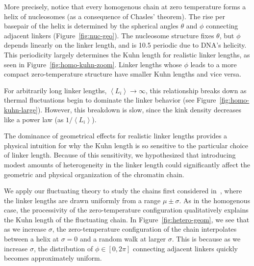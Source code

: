 \documentclass[%
 reprint,
superscriptaddress,
showpacs,preprintnumbers,
 amsmath,amssymb,
 aps,
 prl,
]{revtex4-1}
\newcommand{\meanli}{\left\langle{}L_i\right\rangle}
\begin{document}
More precisely, notice that every homogenous chain at zero temperature forms a
    helix of nucleosomes (as a consequence of Chasles' theorem).
The rise per basepair of the helix is determined by the spherical angles
    $\theta$ and $\phi$ connecting adjacent linkers (Figure~\ref{fig:nuc-geo}).
The nucleosome structure fixes $\theta$, but $\phi$ depends linearly on the
    linker length, and is \SI{10.5}{\basepair} periodic due to DNA's helicity.
This periodicity largely determines the Kuhn length for realistic linker
    lengths, as seen in Figure~\ref{fig:homo-kuhn-zoom}.
Linker lengths whose $\phi$ leads to a more compact zero-temperature structure
    have smaller Kuhn lengths and vice versa.

For arbitrarily long linker lengths, $\meanli\to\infty$, this relationship breaks
    down as thermal fluctuations begin to dominate the linker behavior (see
    Figure~\ref{fig:homo-kuhn-large}).
However, this breakdown is slow, since the kink density decreases like a power law
    (as $1/\meanli$).

The dominance of geometrical effects for realistic linker lengths provides a
    physical intuition for why the Kuhn length is so sensitive to the particular
    choice of linker length.
Because of this sensitivity, we hypothesized that introducing modest amounts of
    heterogeneity in the linker length could significantly affect the geometric
    and physical organization of the chromatin chain.

We apply our fluctuating theory to study the chains first considered
    in~\cite{woodcock1993}, where the linker lengths are drawn uniformly from a
    range $\mu \pm \sigma$.
As in the homogenous case, the processivity of the zero-temperature
    configuration qualitatively explains the Kuhn length of the fluctuating chain.
In Figure~\ref{fig:hetero-geom}, we see that as we increase $\sigma$, the
    zero-temperature configuration of the chain interpolates between a helix at
    $\sigma = 0$ and a random walk at larger $\sigma$.
This is because as we increase $\sigma$, the distribution of $\phi \in [0, 2\pi]$ connecting
    adjacent linkers quickly becomes approximately uniform.
\end{document}
